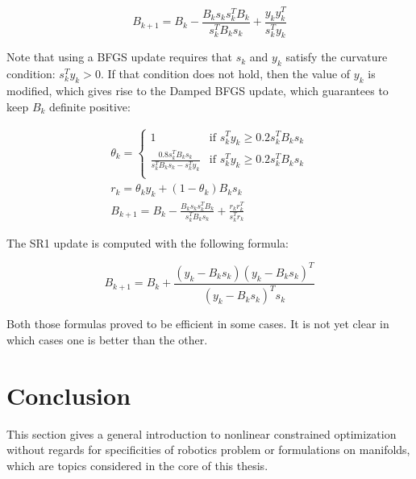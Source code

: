 \begin{equation}
\label{BFGS}
  B_{k+1} = B_k - \frac{B_k s_k s_k^T B_k}{s_k^T B_k s_k} + \frac{y_k y_k^T}{s_k^T y_k}
\end{equation}

Note that using a BFGS update requires that $s_k$ and $y_k$ satisfy the curvature condition: $s_k^T y_k>0$.
If that condition does not hold, then the value of $y_k$ is modified, which gives rise to the Damped BFGS update, which guarantees to keep $B_k$ definite positive:

\begin{equation}
\label{damped_BFGS}
\begin{split}
  \theta_k =
  \left\{
      \begin{array}{ll}
      1 & \text{if } s_k^T y_k \geq 0.2 s_k^T B_k s_k \\
      \frac{0.8 s_k^T B_k s_k}{s_k^T B_k s_k-s_k^T y_k} & \text{if } s_k^T y_k \geq 0.2s_k^T B_k s_k \\
      \end{array}
      \right.\\
      r_k = \theta_k y_k + (1-\theta_k) B_k s_k\\
      B_{k+1} = B_k-\frac{B_k s_k s_k^T B_k}{s_k^T B_k s_k} + \frac{r_k r_k^T}{s_k^T r_k}
\end{split}
\end{equation}

The SR1 update is computed with the following formula:

\begin{equation}
\label{SR1}
B_{k+1} = B_k + \frac{(y_k-B_k s_k){(y_k-B_k s_k)}^T}{{(y_k-B_k s_k)}^T s_k}
\end{equation}

Both those formulas proved to be efficient in some cases. It is not yet clear in which cases one is better than the other.

\section{Conclusion}
This section gives a general introduction to nonlinear constrained optimization without regards for specificities of robotics problem or formulations on manifolds, which are topics considered in the core of this thesis.

